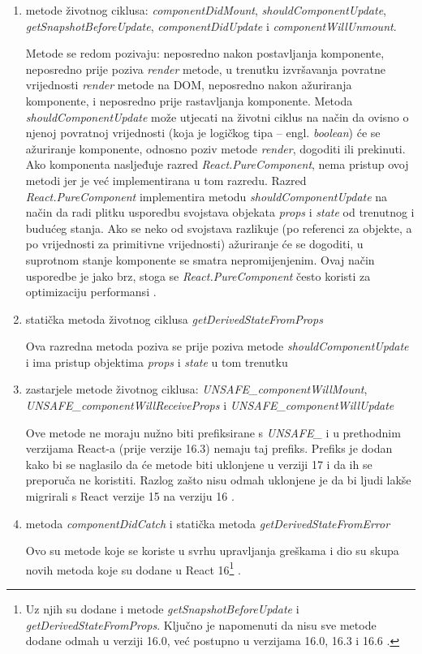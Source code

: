 \documentclass[times, utf8, diplomski, numeric]{fer}
\newcommand{\razmaks}{\vspace{10pt}}
\begin{document}
\begin{enumerate}[label=(\alph*)]
    \item metode životnog ciklusa: \emph{componentDidMount}, \emph{shouldComponentUpdate},
    \break \emph{getSnapshotBeforeUpdate}, \emph{componentDidUpdate} i \emph{componentWillUnmount}.
    
    Metode se redom pozivaju: neposredno nakon postavljanja komponente, neposredno prije poziva \emph{render} metode, u trenutku izvršavanja  povratne vrijednosti \emph{render} metode na DOM, neposredno nakon ažuriranja komponente, i neposredno prije rastavljanja komponente.
    Metoda \emph{shouldComponentUpdate} može utjecati na životni ciklus na način da ovisno o njenoj povratnoj vrijednosti (koja je logičkog tipa – engl. \emph{boolean}) će se ažuriranje komponente, odnosno poziv metode \emph{render}, dogoditi ili prekinuti.
    Ako komponenta nasljeđuje razred \emph{React.PureComponent}, nema pristup ovoj metodi jer je već implementirana u tom razredu.
    Razred \emph{React.PureComponent} implementira metodu \emph{shouldComponentUpdate} na način da radi plitku usporedbu  svojstava objekata \emph{props} i \emph{state} od trenutnog i budućeg stanja. Ako se neko od svojstava razlikuje (po referenci za objekte, a po vrijednosti za primitivne vrijednosti) ažuriranje će se dogoditi, u suprotnom stanje komponente se smatra nepromijenjenim. Ovaj način usporedbe je jako brz, stoga se \emph{React.PureComponent} često koristi za optimizaciju performansi \citep{react_docs}.

    \item statička metoda životnog ciklusa \emph{getDerivedStateFromProps}
    
    Ova razredna metoda poziva se prije poziva metode \emph{shouldComponentUpdate} i ima pristup objektima \emph{props} i \emph{state} u tom trenutku

    \item zastarjele metode životnog ciklusa: \emph{UNSAFE\_componentWillMount},
    \break \emph{UNSAFE\_componentWillReceiveProps} i \emph{UNSAFE\_componentWillUpdate}

    Ove metode ne moraju nužno biti prefiksirane s \emph{UNSAFE\_} i u prethodnim verzijama React-a (prije verzije 16.3) nemaju taj prefiks.
    Prefiks je dodan kako bi se naglasilo da će metode biti uklonjene u verziji 17 i da ih se preporuča ne koristiti.
    Razlog zašto nisu odmah uklonjene je da bi ljudi lakše migrirali s React verzije 15 na verziju 16 \citep{react_16_3}.

    \item metoda \emph{componentDidCatch} i statička metoda \emph{getDerivedStateFromError}
    
    Ovo su metode koje se koriste u svrhu upravljanja greškama  i dio su skupa novih metoda koje su dodane u React 16\footnote{
        Uz njih su dodane i metode \emph{getSnapshotBeforeUpdate} i \emph{getDerivedStateFromProps}. Ključno je napomenuti da nisu sve metode dodane odmah u verziji 16.0, već postupno u verzijama 16.0, 16.3 i 16.6 \citep{gh_react_changelog}.
    } \citep{react_error}.
\end{enumerate}
\razmaks
\end{document}
